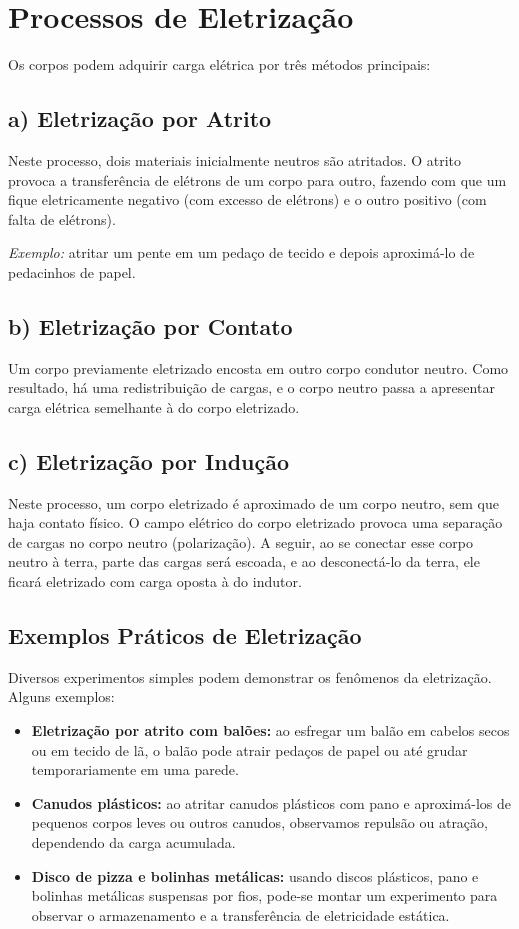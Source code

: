 \section{Processos de Eletrização}
Os corpos podem adquirir carga elétrica por três métodos principais:

\subsection*{a) Eletrização por Atrito}
Neste processo, dois materiais inicialmente neutros são atritados. O atrito provoca a transferência de elétrons de um corpo para outro, fazendo com que um fique eletricamente negativo (com excesso de elétrons) e o outro positivo (com falta de elétrons).

\textit{Exemplo:} atritar um pente em um pedaço de tecido e depois aproximá-lo de pedacinhos de papel.

\subsection*{b) Eletrização por Contato}
Um corpo previamente eletrizado encosta em outro corpo condutor neutro. Como resultado, há uma redistribuição de cargas, e o corpo neutro passa a apresentar carga elétrica semelhante à do corpo eletrizado.

\subsection*{c) Eletrização por Indução}
Neste processo, um corpo eletrizado é aproximado de um corpo neutro, sem que haja contato físico. O campo elétrico do corpo eletrizado provoca uma separação de cargas no corpo neutro (polarização). A seguir, ao se conectar esse corpo neutro à terra, parte das cargas será escoada, e ao desconectá-lo da terra, ele ficará eletrizado com carga oposta à do indutor.

\subsection{Exemplos Práticos de Eletrização}
Diversos experimentos simples podem demonstrar os fenômenos da eletrização. Alguns exemplos:

\begin{itemize}
    \item \textbf{Eletrização por atrito com balões:} ao esfregar um balão em cabelos secos ou em tecido de lã, o balão pode atrair pedaços de papel ou até grudar temporariamente em uma parede.
    
    \item \textbf{Canudos plásticos:} ao atritar canudos plásticos com pano e aproximá-los de pequenos corpos leves ou outros canudos, observamos repulsão ou atração, dependendo da carga acumulada.
    
    \item \textbf{Disco de pizza e bolinhas metálicas:} usando discos plásticos, pano e bolinhas metálicas suspensas por fios, pode-se montar um experimento para observar o armazenamento e a transferência de eletricidade estática.
\end{itemize}

